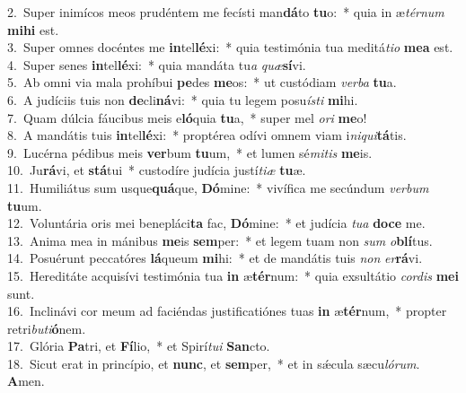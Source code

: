 {2.~}Super inimícos meos prudéntem me fecísti man\textbf{dá}to \textbf{tu}o:~* quia in æ\textit{tér}\textit{num} \textbf{mi}\textbf{hi} est.\\
{3.~}Super omnes docéntes me \textbf{in}tel\textbf{lé}xi:~* quia testimónia tua meditá\textit{ti}\textit{o} \textbf{me}\textbf{a} est.\\
{4.~}Super senes \textbf{in}tel\textbf{lé}xi:~* quia mandáta tu\textit{a} \textit{quæ}\textbf{sí}vi.\\
{5.~}Ab omni via mala prohíbui \textbf{pe}des \textbf{me}os:~* ut custódiam \textit{ver}\textit{ba} \textbf{tu}a.\\
{6.~}A judíciis tuis non \textbf{de}cli\textbf{ná}vi:~* quia tu legem posu\textit{í}\textit{sti} \textbf{mi}hi.\\
{7.~}Quam dúlcia fáucibus meis e\textbf{ló}quia \textbf{tu}a,~* super mel \textit{o}\textit{ri} \textbf{me}o!\\
{8.~}A mandátis tuis \textbf{in}tel\textbf{lé}xi:~* proptérea odívi omnem viam i\textit{ni}\textit{qui}\textbf{tá}tis.\\
{9.~}Lucérna pédibus meis \textbf{ver}bum \textbf{tu}um,~* et lumen sé\textit{mi}\textit{tis} \textbf{me}is.\\
{10.~}Ju\textbf{rá}vi, et \textbf{stá}tui~* custodíre judícia justí\textit{ti}\textit{æ} \textbf{tu}æ.\\
{11.~}Humiliátus sum usque\textbf{quá}que, \textbf{Dó}mine:~* vivífica me secúndum \textit{ver}\textit{bum} \textbf{tu}um.\\
{12.~}Voluntária oris mei benepláci\textbf{ta} fac, \textbf{Dó}mine:~* et judícia \textit{tu}\textit{a} \textbf{do}\textbf{ce} me.\\
{13.~}Anima mea in mánibus \textbf{me}is \textbf{sem}per:~* et legem tuam non \textit{sum} \textit{o}\textbf{blí}tus.\\
{14.~}Posuérunt peccatóres \textbf{lá}queum \textbf{mi}hi:~* et de mandátis tuis \textit{non} \textit{er}\textbf{rá}vi.\\
{15.~}Hereditáte acquisívi testimónia tua \textbf{in} æ\textbf{tér}num:~* quia exsultátio \textit{cor}\textit{dis} \textbf{me}\textbf{i} sunt.\\
{16.~}Inclinávi cor meum ad faciéndas justificatiónes tuas \textbf{in} æ\textbf{tér}num,~* propter retri\textit{bu}\textit{ti}\textbf{ó}nem.\\
{17.~}Glória \textbf{Pa}tri, et \textbf{Fí}lio,~* et Spirí\textit{tu}\textit{i} \textbf{San}cto.\\
{18.~}Sicut erat in princípio, et \textbf{nunc}, et \textbf{sem}per,~* et in sǽcula sæcu\textit{ló}\textit{rum}. \textbf{A}men.\\
